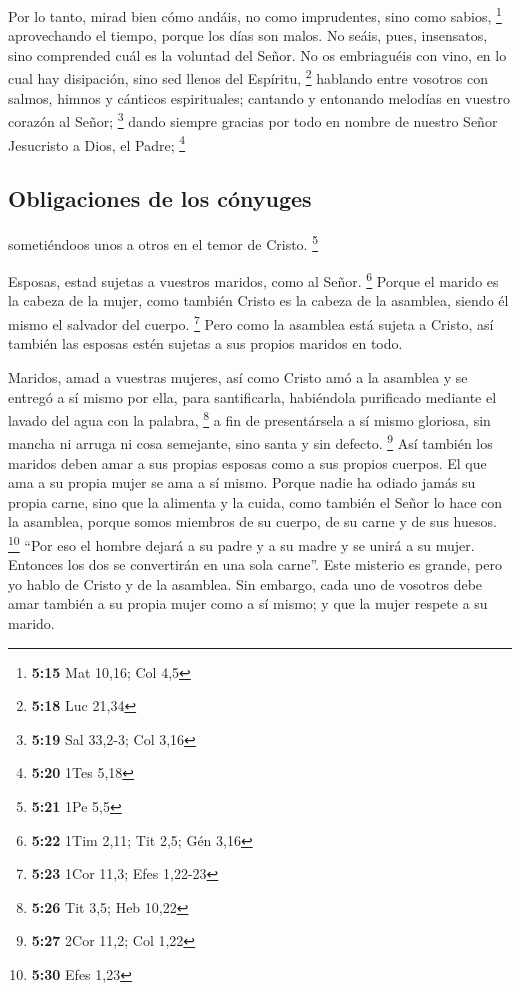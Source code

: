  Por lo tanto, mirad bien cómo andáis, no como
imprudentes, sino como sabios, \footnote{\textbf{5:15} Mat 10,16; Col
  4,5}  aprovechando el tiempo, porque los días son
malos.  No seáis, pues, insensatos, sino comprended cuál
es la voluntad del Señor.  No os embriaguéis con vino, en
lo cual hay disipación, sino sed llenos del Espíritu, \footnote{\textbf{5:18}
  Luc 21,34}  hablando entre vosotros con salmos, himnos
y cánticos espirituales; cantando y entonando melodías en vuestro
corazón al Señor; \footnote{\textbf{5:19} Sal 33,2-3; Col 3,16}
 dando siempre gracias por todo en nombre de nuestro
Señor Jesucristo a Dios, el Padre; \footnote{\textbf{5:20} 1Tes 5,18}

\hypertarget{obligaciones-de-los-cuxf3nyuges}{%
\subsection{Obligaciones de los
cónyuges}\label{obligaciones-de-los-cuxf3nyuges}}

 sometiéndoos unos a otros en el temor de Cristo.
\footnote{\textbf{5:21} 1Pe 5,5}

 Esposas, estad sujetas a vuestros maridos, como al
Señor. \footnote{\textbf{5:22} 1Tim 2,11; Tit 2,5; Gén 3,16}
 Porque el marido es la cabeza de la mujer, como también
Cristo es la cabeza de la asamblea, siendo él mismo el salvador del
cuerpo. \footnote{\textbf{5:23} 1Cor 11,3; Efes 1,22-23} 
Pero como la asamblea está sujeta a Cristo, así también las esposas
estén sujetas a sus propios maridos en todo.

 Maridos, amad a vuestras mujeres, así como Cristo amó a
la asamblea y se entregó a sí mismo por ella,  para
santificarla, habiéndola purificado mediante el lavado del agua con la
palabra, \footnote{\textbf{5:26} Tit 3,5; Heb 10,22}  a
fin de presentársela a sí mismo gloriosa, sin mancha ni arruga ni cosa
semejante, sino santa y sin defecto. \footnote{\textbf{5:27} 2Cor 11,2;
  Col 1,22}  Así también los maridos deben amar a sus
propias esposas como a sus propios cuerpos. El que ama a su propia mujer
se ama a sí mismo.  Porque nadie ha odiado jamás su
propia carne, sino que la alimenta y la cuida, como también el Señor lo
hace con la asamblea,  porque somos miembros de su
cuerpo, de su carne y de sus huesos. \footnote{\textbf{5:30} Efes 1,23}
 ``Por eso el hombre dejará a su padre y a su madre y se
unirá a su mujer. Entonces los dos se convertirán en una sola carne''.
 Este misterio es grande, pero yo hablo de Cristo y de la
asamblea.  Sin embargo, cada uno de vosotros debe amar
también a su propia mujer como a sí mismo; y que la mujer respete a su
marido.

